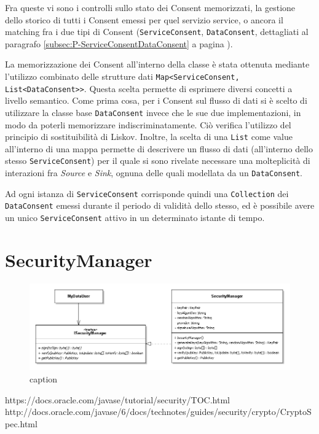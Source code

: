 Fra queste vi sono i controlli sullo stato dei Consent memorizzati, la gestione dello storico di tutti i Consent emessi per quel servizio service, o ancora il matching fra i due tipi di Consent (\texttt{ServiceConsent}, \texttt{DataConsent}, dettagliati al paragrafo \ref{subsec:P-ServiceConsentDataConsent} a pagina \pageref{subsec:P-ServiceConsentDataConsent}).

La memorizzazione dei Consent all’interno della classe \`e stata ottenuta mediante l’utilizzo combinato delle strutture dati \texttt{Map<ServiceConsent, List<DataConsent>>}. Questa scelta permette di esprimere diversi concetti a livello semantico. Come prima cosa, per i Consent sul flusso di dati si \`e scelto di utilizzare la classe base \texttt{DataConsent} invece che le sue due implementazioni, in modo da poterli memorizzare indiscriminatamente. Ci\`o verifica l’utilizzo del principio di sostituibilit\`a di Liskov. Inoltre, la scelta di una \texttt{List} come value all’interno di una mappa permette di descrivere un flusso di dati (all’interno dello stesso \texttt{ServiceConsent}) per il quale si sono rivelate necessare una molteplicit\`a di interazioni fra \textit{Source} e \textit{Sink}, ognuna delle quali modellata da un \texttt{DataConsent}.

Ad ogni istanza di \texttt{ServiceConsent} corrisponde quindi una \texttt{Collection} dei \texttt{DataConsent} emessi durante il periodo di validit\`a dello stesso, ed \`e possibile avere un unico \texttt{ServiceConsent} attivo in un determinato istante di tempo.

\section{SecurityManager}
\begin{figure} [h]
	\includegraphics[width=\linewidth]{pictures/Accounting-SecurityManager.png}
	\caption{caption}
	\label{fig:Accounting-SecurityManager}
\end{figure}
https://docs.oracle.com/javase/tutorial/security/TOC.html
http://docs.oracle.com/javase/6/docs/technotes/guides/security/crypto/CryptoSpec.html

